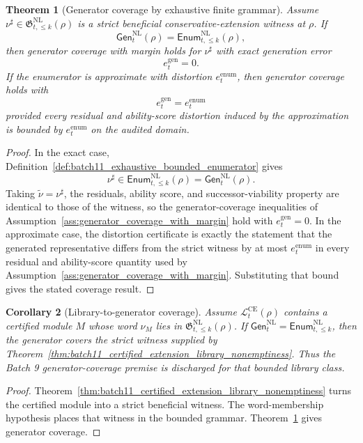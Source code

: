 \documentclass[11pt]{article}
\newtheorem{theorem}{Theorem}[section]
\newtheorem{corollary}[theorem]{Corollary}
\newcommand{\Lcal}{\mathcal{L}}
\newcommand{\1}{\mathbf{1}}
\begin{document}
\begin{theorem}[Generator coverage by exhaustive finite grammar]
\label{thm:batch11_generator_coverage_finite_grammar}
Assume \(\nu^\sharp\in\mathfrak G_{t,\le k}^{\mathrm{NL}}(\rho)\) is a strict beneficial conservative-extension witness at \(\rho\).  If
\[
\mathsf{Gen}_t^{\mathrm{NL}}(\rho)
=
\mathsf{Enum}_{t,\le k}^{\mathrm{NL}}(\rho),
\]
then generator coverage with margin holds for \(\nu^\sharp\) with exact generation error
\[
e_t^{\mathrm{gen}}=0.
\]
If the enumerator is approximate with distortion \(e_t^{\mathrm{enum}}\), then generator coverage holds with
\[
e_t^{\mathrm{gen}}=e_t^{\mathrm{enum}}
\]
provided every residual and ability-score distortion induced by the approximation is bounded by \(e_t^{\mathrm{enum}}\) on the audited domain.
\end{theorem}

\begin{proof}
In the exact case, Definition~\ref{def:batch11_exhaustive_bounded_enumerator} gives
\[
\nu^\sharp\in\mathsf{Enum}_{t,\le k}^{\mathrm{NL}}(\rho)=\mathsf{Gen}_t^{\mathrm{NL}}(\rho).
\]
Taking \(\widetilde\nu=\nu^\sharp\), the residuals, ability score, and successor-viability property are identical to those of the witness, so the generator-coverage inequalities of Assumption~\ref{ass:generator_coverage_with_margin} hold with \(e_t^{\mathrm{gen}}=0\).  In the approximate case, the distortion certificate is exactly the statement that the generated representative differs from the strict witness by at most \(e_t^{\mathrm{enum}}\) in every residual and ability-score quantity used by Assumption~\ref{ass:generator_coverage_with_margin}.  Substituting that bound gives the stated coverage result.
\end{proof}

\begin{corollary}[Library-to-generator coverage]
\label{cor:batch11_library_to_generator_coverage}
Assume \(\Lcal_t^{\mathrm{CE}}(\rho)\) contains a certified module \(M\) whose word \(\nu_M\) lies in \(\mathfrak G_{t,\le k}^{\mathrm{NL}}(\rho)\).  If \(\mathsf{Gen}_t^{\mathrm{NL}}=\mathsf{Enum}_{t,\le k}^{\mathrm{NL}}\), then the generator covers the strict witness supplied by Theorem~\ref{thm:batch11_certified_extension_library_nonemptiness}.  Thus the Batch 9 generator-coverage premise is discharged for that bounded library class.
\end{corollary}

\begin{proof}
Theorem~\ref{thm:batch11_certified_extension_library_nonemptiness} turns the certified module into a strict beneficial witness.  The word-membership hypothesis places that witness in the bounded grammar.  Theorem~\ref{thm:batch11_generator_coverage_finite_grammar} gives generator coverage.
\end{proof}
\end{document}
